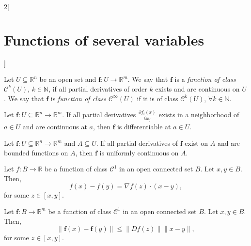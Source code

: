 \documentclass[class=article,10pt,crop=false]{standalone}
\begin{document}
\begin{multicols}{2}[\section{Functions of several variables}]
\begin{theorem}
\end{theorem}
\begin{definition}
Let $U\subseteq\mathbb{R}^n$ be an open set and $\boldsymbol{f}:U\rightarrow\mathbb{R}^m$. We say that $\boldsymbol{f}$ is a \textit{function of class $\mathcal{C}^k(U)$}, $k\in\mathbb{N}$, if all partial derivatives of order $k$ exists and are continuous on $U$. We say that $\boldsymbol{f}$ is \textit{function of class $\mathcal{C}^\infty(U)$} if it is of class $\mathcal{C}^k(U)$, $\forall k\in\mathbb{N}$.
\end{definition}
\begin{theorem}
Let $\boldsymbol{f}:U\subseteq\mathbb{R}^n\rightarrow\mathbb{R}^m$. If all partial derivatives $\displaystyle \frac{\partial f_i(x)}{\partial x_j}$ exists in a  neighborhood of $a\in U$ and are continuous at $a$, then $\boldsymbol{f}$ is differentiable at $a\in U$.
\end{theorem}
\begin{prop}
Let $\boldsymbol{f}:U\subseteq\mathbb{R}^n\rightarrow\mathbb{R}^m$ and $A\subseteq U$. If all partial derivatives of $\boldsymbol{f}$ exist on $A$ and are bounded functions on $A$, then $\boldsymbol{f}$ is uniformly continuous on $A$.
\end{prop}
\begin{theorem}
Let $f:B\rightarrow\mathbb{R}$ be a function of class $\mathcal{C}^1$ in an open connected set $B$. Let $x,y\in B$. Then, $$f(x)-f(y)=\nabla f(z)\cdot(x-y),$$ for some $z\in[x,y]$.
\end{theorem}
\begin{theorem}
Let $\boldsymbol{f}:B\rightarrow\mathbb{R}^m$ be a function of class $\mathcal{C}^1$ in an open connected set $B$. Let $x,y\in B$. Then, $$\|\boldsymbol{f}(x)-\boldsymbol{f}(y)\|\leq\|Df(z)\|\|x-y\|,$$ for some $z\in[x,y]$.
\end{theorem}

\end{multicols}
\end{document}

